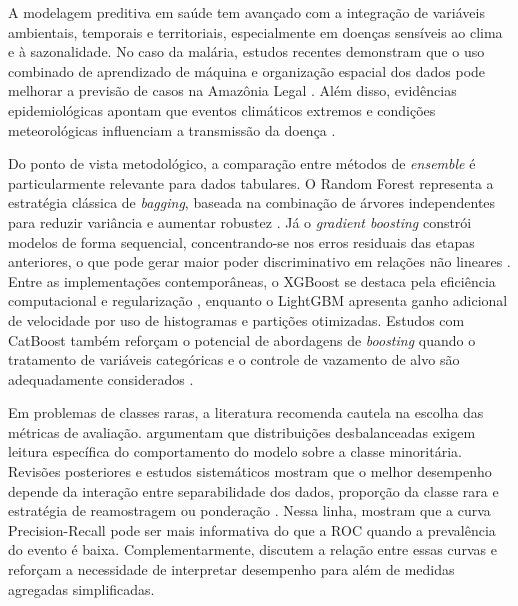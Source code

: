 
A modelagem preditiva em sa\'ude tem avan\c{c}ado com a integra\c{c}\~ao de vari\'aveis ambientais, temporais e territoriais, especialmente em doen\c{c}as sens\'iveis ao clima e \`a sazonalidade. No caso da mal\'aria, estudos recentes demonstram que o uso combinado de aprendizado de m\'aquina e organiza\c{c}\~ao espacial dos dados pode melhorar a previs\~ao de casos na Amaz\^onia Legal \cite{monteiro2025integrating}. Al\'em disso, evid\^encias epidemiol\'ogicas apontam que eventos clim\'aticos extremos e condi\c{c}\~oes meteorol\'ogicas influenciam a transmiss\~ao da doen\c{c}a \cite{arisco2025impact}.

Do ponto de vista metodol\'ogico, a compara\c{c}\~ao entre m\'etodos de \textit{ensemble} \'e particularmente relevante para dados tabulares. O Random Forest representa a estrat\'egia cl\'assica de \textit{bagging}, baseada na combina\c{c}\~ao de \'arvores independentes para reduzir vari\^ancia e aumentar robustez \cite{breiman2001random}. J\'a o \textit{gradient boosting} constr\'oi modelos de forma sequencial, concentrando-se nos erros residuais das etapas anteriores, o que pode gerar maior poder discriminativo em rela\c{c}\~oes n\~ao lineares \cite{friedman2001greedy}. Entre as implementa\c{c}\~oes contempor\^aneas, o XGBoost se destaca pela efici\^encia computacional e regulariza\c{c}\~ao \cite{chen2016xgboost}, enquanto o LightGBM apresenta ganho adicional de velocidade por uso de histogramas e parti\c{c}\~oes otimizadas. Estudos com CatBoost tamb\'em refor\c{c}am o potencial de abordagens de \textit{boosting} quando o tratamento de vari\'aveis categ\'oricas e o controle de vazamento de alvo s\~ao adequadamente considerados \cite{prokhorenkova2019catboostunbiasedboostingcategorical}.

Em problemas de classes raras, a literatura recomenda cautela na escolha das m\'etricas de avalia\c{c}\~ao.  argumentam que distribui\c{c}\~oes desbalanceadas exigem leitura espec\'ifica do comportamento do modelo sobre a classe minorit\'aria. Revis\~oes posteriores e estudos sistem\'aticos mostram que o melhor desempenho depende da intera\c{c}\~ao entre separabilidade dos dados, propor\c{c}\~ao da classe rara e estrat\'egia de reamostragem ou pondera\c{c}\~ao \cite{branco2015surveypredictivemodellingimbalanced,johnson2019survey,BUDA2018249}. Nessa linha,  mostram que a curva Precision-Recall pode ser mais informativa do que a ROC quando a preval\^encia do evento \'e baixa. Complementarmente,  discutem a rela\c{c}\~ao entre essas curvas e refor\c{c}am a necessidade de interpretar desempenho para al\'em de medidas agregadas simplificadas.


